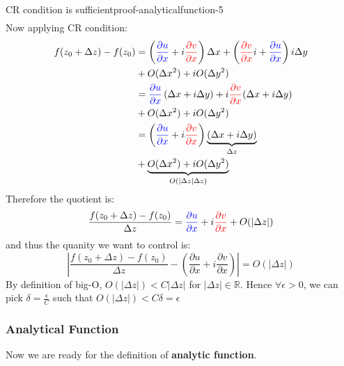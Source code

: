 \begin{mystthmproof}{CR condition is sufficient}{proof-analyticalfunction-5}
\begin{equation}
\begin{aligned}
\end{aligned}
\end{equation}
Now applying CR condition:
\begin{equation}
\begin{aligned}
f(z_0+\Delta z)-f(z_0) &=  \left(\textcolor{blue}{\frac{\partial u}{\partial x}}+i\textcolor{red}{\frac{\partial v}{\partial x}}\right)\Delta x+\left(\textcolor{red}{\frac{\partial v}{\partial x}}i + \textcolor{blue}{\frac{\partial u}{\partial x}}\right)i\Delta y\\ &+ O(\Delta x^2)+iO(\Delta y^2)  \\
&= \textcolor{blue}{\frac{\partial u}{\partial x}}\left(\Delta x + i\Delta y\right) + i\textcolor{red}{\frac{\partial v}{\partial x}}(\Delta x+i\Delta y)
\\ &+ O(\Delta x^2)+iO(\Delta y^2) \\
&= \left(\textcolor{blue}{\frac{\partial u}{\partial x}} + i\textcolor{red}{\frac{\partial v}{\partial x}}\right)\underbrace{(\Delta x +i\Delta y)}_{\Delta z}\\
&+ \underbrace{O(\Delta x^2)+iO(\Delta y^2)}_{O(|\Delta z|\Delta z)} \\
\end{aligned}
\end{equation}
Therefore the quotient is:
\begin{equation}
\frac{f(z_0+\Delta z)-f(z_0)}{\Delta z} =\textcolor{blue}{\frac{\partial u}{\partial x}} + i\textcolor{red}{\frac{\partial v}{\partial x} }+O(|\Delta z|)
\end{equation}
and thus the quanity we want to control is:
\begin{equation}
\left| \frac{f(z_0+\Delta z)-f(z_0)}{\Delta z} - \left(\frac{\partial u}{\partial x} + i\frac{\partial v}{\partial x}\right) \right|=O(|\Delta z|)
\end{equation}
By definition of big-O, $O(|\Delta z|)<C|\Delta z|$ for $|\Delta z|\in \mathbb{R}$. Hence $\forall \epsilon >0$, we can pick $\delta =\frac{\epsilon}{C}$ such that $O(|\Delta z|)<C\delta =\epsilon$

\end{mystthmproof}
\subsubsection{Analytical Function}

Now we are ready for the definition of \textbf{analytic function}.

